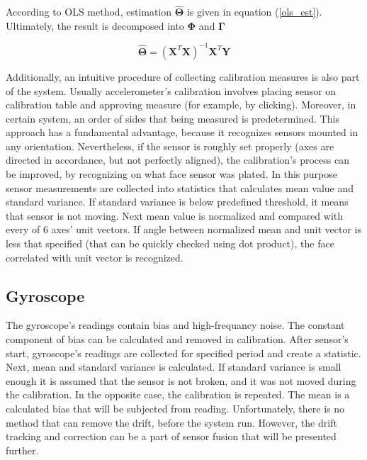 According to OLS method, estimation $\bm{\hat{\Theta}}$ is given in equation (\ref{ols_est}). Ultimately, the result is decomposed into $\bm{\Phi}$ and $\bm{\Gamma}$

\begin{equation}
	\bm{\hat{\Theta}} = \left( \bm{X}^T \bm{X} \right)^{-1} \bm{X}^T \bm{Y}
	\label{ols_est}
\end{equation}

Additionally, an intuitive procedure of collecting calibration measures is also part of the system. Usually accelerometer's calibration involves placing sensor on calibration table and approving measure (for example, by clicking). Moreover, in certain system, an order of sides that being measured is predetermined. This approach has a fundamental advantage, because it recognizes sensors mounted in any orientation. Nevertheless, if the sensor is roughly set properly (axes are directed in accordance, but not perfectly aligned), the calibration's process can be improved, by recognizing on what face sensor was plated. In this purpose sensor measurements are collected into statistics that calculates mean value and standard variance. If standard variance is below predefined threshold, it means that sensor is not moving. Next mean value is normalized and compared with every of 6 axes' unit vectors. If angle between normalized mean and unit vector is less that specified (that can be quickly checked using dot product), the face correlated with unit vector is recognized.



\subsection{Gyroscope}

The gyroscope's readings contain bias and high-frequancy noise. The constant component of bias can be calculated and removed in calibration. After sensor's start, gyroscope's readings are collected for specified period and create a statistic. Next, mean and standard variance is calculated. If standard variance is small enough it is assumed that the sensor is not broken, and it was not moved during the calibration. In the opposite case, the calibration is repeated. The mean is a calculated bias that will be subjected from reading.
Unfortunately, there is no method that can remove the drift, before the system run. However, the drift tracking and correction can be a part of sensor fusion that will be presented further.\\

